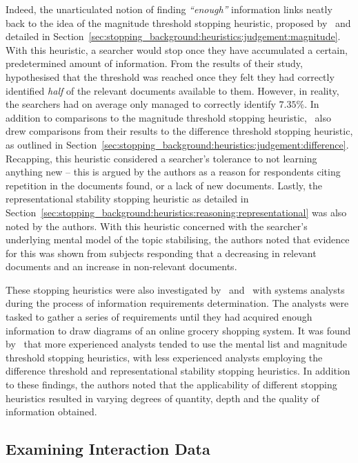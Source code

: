 Indeed, the unarticulated notion of finding \emph{``enough''} information links neatly back to the idea of the magnitude threshold stopping heuristic, proposed by~\cite{nickles1995judgment} and detailed in Section~\ref{sec:stopping_background:heuristics:judgement:magnitude}. With this heuristic, a searcher would stop once they have accumulated a certain, predetermined amount of information. From the results of their study,~\cite{dostert2009satisficing} hypothesised that the threshold was reached once they felt they had correctly identified \emph{half} of the relevant documents available to them. However, in reality, the searchers had on average only managed to correctly identify $7.35\%$. In addition to comparisons to the magnitude threshold stopping heuristic,~\cite{dostert2009satisficing} also drew comparisons from their results to the difference threshold stopping heuristic, as outlined in Section~\ref{sec:stopping_background:heuristics:judgement:difference}. Recapping, this heuristic considered a searcher's tolerance to not learning anything new -- this is argued by the authors as a reason for respondents citing repetition in the documents found, or a lack of new documents. Lastly, the representational stability stopping heuristic as detailed in Section~\ref{sec:stopping_background:heuristics:reasoning:representational} was also noted by the authors. With this heuristic concerned with the searcher's underlying mental model of the topic stabilising, the authors noted that evidence for this was shown from subjects responding that a decreasing in relevant documents and an increase in non-relevant documents.

These stopping heuristics were also investigated by~\cite{browne2004stopping_rules} and~\cite{pitts2004stopping_rules} with systems analysts during the process of information requirements determination. The analysts were tasked to gather a series of requirements until they had acquired enough information to draw diagrams of an online grocery shopping system. It was found by~\cite{browne2004stopping_rules} that more experienced analysts tended to use the mental list and magnitude threshold stopping heuristics, with less experienced analysts employing the difference threshold and representational stability stopping heuristics. In addition to these findings, the authors noted that the applicability of different stopping heuristics resulted in varying degrees of quantity, depth and the quality of information obtained.



\subsection{Examining Interaction Data}



